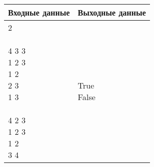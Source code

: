 \documentclass{extarticle}
\begin{document}
\begin{table}[H]
\begin{center}
\begin{tabular}{|m{4cm}|m{4cm}|}
\hline
Входные данные & Выходные данные \\ \hline
\makecell[l]{
2
\\\\
4 3 3\\
1 2 3\\
1 2\\
2 3\\
1 3
\\\\
4 2 3\\
1 2 3\\
1 2\\
3 4
}
&
\makecell[l]{
True\\
False
}
\\ \hline

\end{tabular}
\end{center}
\end{table}
\end{document}

